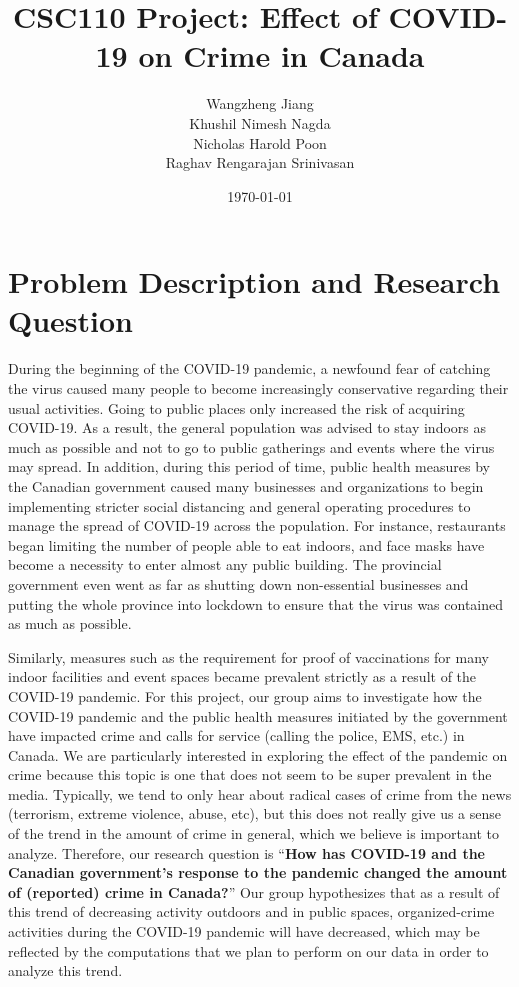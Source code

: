\documentclass[fontsize=11pt]{article}
\title{CSC110 Project: \textbf{Effect of COVID-19 on Crime in Canada}}
\author{Wangzheng Jiang\\
		Khushil Nimesh Nagda\\
		Nicholas Harold Poon\\
		Raghav Rengarajan Srinivasan}
\date{\today}
\newcommand{\quotes}[1]{``#1''}
\begin{document}
\maketitle
\section{Problem Description and Research Question}
\par
During the beginning of the COVID-19 pandemic, a newfound fear of catching the virus caused many people to become increasingly conservative regarding their usual activities. Going to public places only increased the risk of acquiring COVID-19. As a result, the general population was advised to stay indoors as much as possible and not to go to public gatherings and events where the virus may spread. In addition, during this period of time, public health measures by the Canadian government caused many businesses and organizations to begin implementing stricter social distancing and general operating procedures to manage the spread of COVID-19 across the population. For instance, restaurants began limiting the number of people able to eat indoors, and face masks have become a necessity to enter almost any public building. The provincial government even went as far as shutting down non-essential businesses and putting the whole province into lockdown to ensure that the virus was contained as much as possible.

Similarly, measures such as the requirement for proof of vaccinations for many indoor facilities and event spaces became prevalent strictly as a result of the COVID-19 pandemic. For this project, our group aims to investigate how the COVID-19 pandemic and the public health measures initiated by the government have impacted crime and calls for service (calling the police, EMS, etc.) in Canada. We are particularly interested in exploring the effect of the pandemic on crime because this topic is one that does not seem to be super prevalent in the media. Typically, we tend to only hear about radical cases of crime from the news (terrorism, extreme violence, abuse, etc), but this does not really give us a sense of the trend in the amount of crime in general, which we believe is important to analyze. Therefore, our research question is \quotes{\textbf{How has COVID-19 and the Canadian government’s response to the pandemic changed the amount of (reported) crime in Canada?}} Our group hypothesizes that as a result of this trend of decreasing activity outdoors and in public spaces, organized-crime activities during the COVID-19 pandemic will have decreased, which may be reflected by the computations that we plan to perform on our data in order to analyze this trend.
\end{document}
